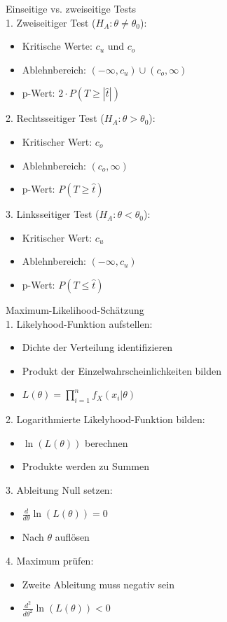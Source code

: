 \begin{concept}{Einseitige vs. zweiseitige Tests}\\
1. Zweiseitiger Test ($H_A: \theta \neq \theta_0$):
   \begin{itemize}
     \item Kritische Werte: $c_u$ und $c_o$
     \item Ablehnbereich: $(-\infty,c_u) \cup (c_o,\infty)$
     \item p-Wert: $2 \cdot P(T \geq |\hat{t}|)$
   \end{itemize}

2. Rechtsseitiger Test ($H_A: \theta > \theta_0$):
   \begin{itemize}
     \item Kritischer Wert: $c_o$
     \item Ablehnbereich: $(c_o,\infty)$
     \item p-Wert: $P(T \geq \hat{t})$
   \end{itemize}

3. Linksseitiger Test ($H_A: \theta < \theta_0$):
   \begin{itemize}
     \item Kritischer Wert: $c_u$
     \item Ablehnbereich: $(-\infty,c_u)$
     \item p-Wert: $P(T \leq \hat{t})$
   \end{itemize}
\end{concept}


\begin{KR}{Maximum-Likelihood-Schätzung}\\
1. Likelyhood-Funktion aufstellen:
   \begin{itemize}
     \item Dichte der Verteilung identifizieren
     \item Produkt der Einzelwahrscheinlichkeiten bilden
     \item $L(\theta) = \prod_{i=1}^n f_X(x_i|\theta)$
   \end{itemize}

2. Logarithmierte Likelyhood-Funktion bilden:
   \begin{itemize}
     \item $\ln(L(\theta))$ berechnen
     \item Produkte werden zu Summen
   \end{itemize}

3. Ableitung Null setzen:
   \begin{itemize}
     \item $\frac{d}{d\theta}\ln(L(\theta)) = 0$
     \item Nach $\theta$ auflösen
   \end{itemize}

4. Maximum prüfen:
   \begin{itemize}
     \item Zweite Ableitung muss negativ sein
     \item $\frac{d^2}{d\theta^2}\ln(L(\theta)) < 0$
   \end{itemize}
\end{KR}

